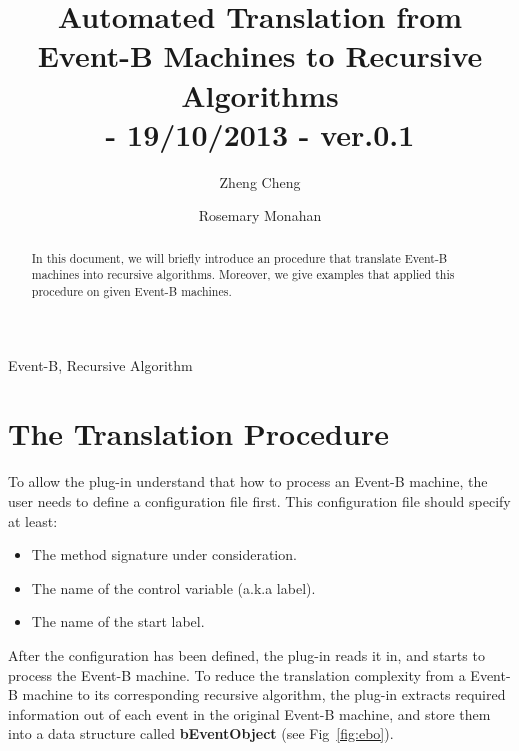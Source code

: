 \documentclass{easychair}
\newenvironment{keywords}{
       \list{}{\advance\topsep by0.35cm\relax\small
       \leftmargin=1cm
       \labelwidth=0.35cm
       \listparindent=0.35cm
       \itemindent\listparindent
       \rightmargin\leftmargin}\item[\hskip\labelsep
                                     \bfseries Keywords:]}
     {\endlist}
\begin{document}
\pagestyle{plain}

\title{Automated Translation from Event-B Machines to Recursive Algorithms
\\\small{- 19/10/2013 - ver.0.1} 
}
\author{
Zheng Cheng \and
Rosemary Monahan 
}


\maketitle  

\begin{abstract}
In this document, we will briefly introduce an procedure that translate Event-B machines into recursive algorithms. Moreover, we give examples that applied this procedure on given Event-B machines. 
\end{abstract}   

\begin{keywords}
 Event-B,
 Recursive Algorithm
\end{keywords}

\section{The Translation Procedure}
To allow the plug-in understand that how to process an Event-B machine, the user needs to define a configuration file first. This configuration file should specify at least:
\begin{itemize}
	\item The method signature under consideration.
	\item The name of the control variable (a.k.a label).
	\item The name of the start label.
\end{itemize}

After the configuration has been defined, the plug-in reads it in, and starts to process the Event-B machine. To reduce the translation complexity from a Event-B machine to its corresponding recursive algorithm, the plug-in extracts required information out of each event in the original Event-B machine, and store them into a data structure called \textbf{bEventObject} (see Fig~\ref{fig:ebo}). 
\end{document}
